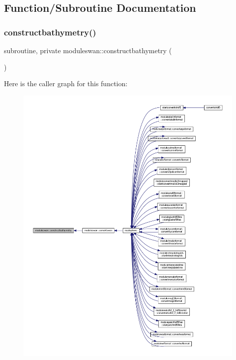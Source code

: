 \subsection{Function/\+Subroutine Documentation}
\mbox{\label{namespacemoduleswan_ae97863dddc759a89a93ecb9148e2ef90}} 
\subsubsection{\texorpdfstring{constructbathymetry()}{constructbathymetry()}}
{\footnotesize\ttfamily subroutine, private moduleswan\+::constructbathymetry (\begin{DoxyParamCaption}{ }\end{DoxyParamCaption})\hspace{0.3cm}{\ttfamily [private]}}

Here is the caller graph for this function\+:\nopagebreak
\begin{figure}[H]
\begin{center}
\leavevmode
\includegraphics[width=350pt]{namespacemoduleswan_ae97863dddc759a89a93ecb9148e2ef90_icgraph}
\end{center}
\end{figure}
\mbox{\label{namespacemoduleswan_a8d797caa947f1c5d987ee4c2132ce350}} 
